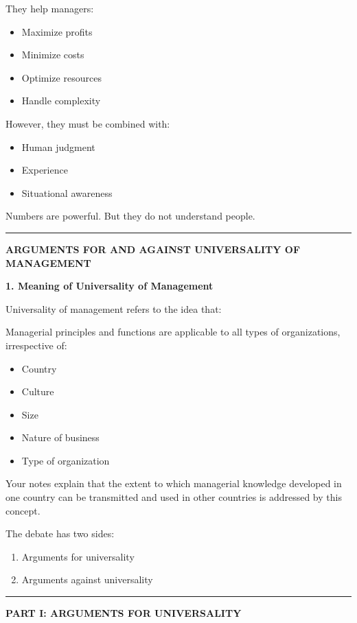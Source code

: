 \documentclass[10pt,a4paper]{article}
\newcommand{\separator}{\vspace{0.4em}\noindent\rule{\linewidth}{0.6pt}\vspace{0.4em}}
\begin{document}
They help managers:
\begin{itemize}
  \item Maximize profits
  \item Minimize costs
  \item Optimize resources
  \item Handle complexity
\end{itemize}

However, they must be combined with:
\begin{itemize}
  \item Human judgment
  \item Experience
  \item Situational awareness
\end{itemize}

Numbers are powerful.
But they do not understand people.

\separator

\begin{center}
  \large\textbf{ARGUMENTS FOR AND AGAINST UNIVERSALITY OF MANAGEMENT}
\end{center}

\textbf{1. Meaning of Universality of Management}

Universality of management refers to the idea that:

Managerial principles and functions are applicable to all types of organizations, irrespective
of:
\begin{itemize}
  \item Country
  \item Culture
  \item Size
  \item Nature of business
  \item Type of organization
\end{itemize}

Your notes explain that the extent to which managerial knowledge developed in one country
can be transmitted and used in other countries is addressed by this concept.

The debate has two sides:
\begin{enumerate}
  \item Arguments for universality
  \item Arguments against universality
\end{enumerate}

\separator

\begin{center}
  \large\textbf{PART I: ARGUMENTS FOR UNIVERSALITY}
\end{center}
\end{document}
